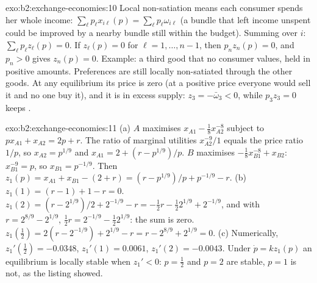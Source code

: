 \begin{solution}{exo:b2:exchange-economies:10}
Local non-satiation means each consumer spends her whole income: $\sum_\ell p_\ell x_{i\ell}(p) =
\sum_\ell p_\ell\omega_{i\ell}$ (a bundle that left income unspent could be improved by a nearby bundle
still within the budget). Summing over $i$: $\sum_\ell p_\ell z_\ell(p) = 0$. If $z_\ell(p) = 0$ for
$\ell = 1, \dots, n - 1$, then $p_n z_n(p) = 0$, and $p_n > 0$ gives $z_n(p) = 0$. Example: a third good
that no consumer values, held in positive amounts. Preferences are still locally non-satiated through
the other goods. At any equilibrium its price is zero (at a positive price everyone would sell it and no
one buy it), and it is in excess supply: $z_3 = -\bar\omega_3 < 0$, while $p_3z_3 = 0$ keeps .
\end{solution}

\begin{solution}{exo:b2:exchange-economies:11}
(a) $A$ maximises $x_{A1} - \tfrac18 x_{A2}^{-8}$ subject to $px_{A1} + x_{A2} = 2p + r$. The ratio of
marginal utilities $x_{A2}^{-9}/1$ equals the price ratio $1/p$, so $x_{A2} = p^{1/9}$ and $x_{A1} = 2 +
(r - p^{1/9})/p$. $B$ maximises $-\tfrac18x_{B1}^{-8} + x_{B2}$: $x_{B1}^{-9} = p$, so $x_{B1} = p^{-1/9}$.
Then $z_1(p) = x_{A1} + x_{B1} - (2 + r) = (r - p^{1/9})/p + p^{-1/9} - r$.
(b) $z_1(1) = (r - 1) + 1 - r = 0$. $z_1(2) = (r - 2^{1/9})/2 + 2^{-1/9} - r = -\tfrac12 r - \tfrac12
2^{1/9} + 2^{-1/9}$, and with $r = 2^{8/9} - 2^{1/9}$, $\tfrac12 r = 2^{-1/9} - \tfrac12 2^{1/9}$: the sum
is zero. $z_1(\tfrac12) = 2(r - 2^{-1/9}) + 2^{1/9} - r = r - 2^{8/9} + 2^{1/9} = 0$.
(c) Numerically, $z_1'(\tfrac12) = -0.0348$, $z_1'(1) = 0.0061$, $z_1'(2) = -0.0043$. Under $\dot p =
kz_1(p)$ an equilibrium is locally stable when $z_1' < 0$: $p = \tfrac12$ and $p = 2$ are stable, $p = 1$
is not, as the listing showed.
\end{solution}

